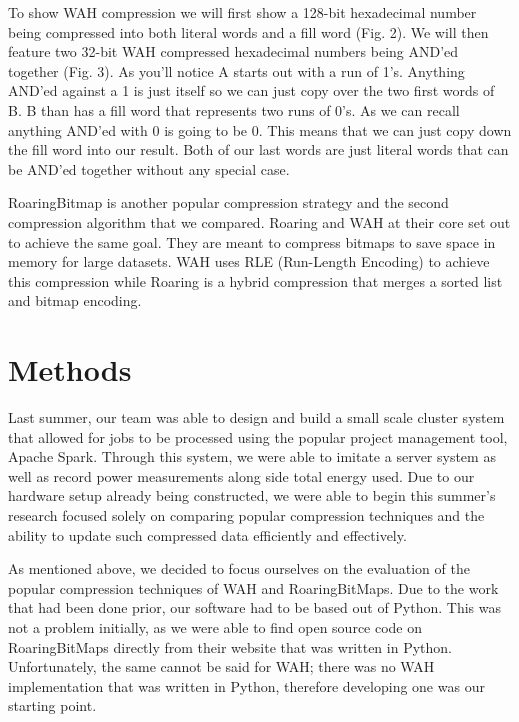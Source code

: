 \documentclass{article}
\begin{document}
To show WAH compression we will first show a 128-bit hexadecimal number being compressed into both literal words and a fill word (Fig. 2). We will then feature two 32-bit WAH compressed hexadecimal numbers being AND’ed together (Fig. 3). As you’ll notice A starts out with a run of 1’s. Anything AND’ed against a 1 is just itself so we can just copy over the two first words of B. B than has a fill word that represents two runs of 0’s. As we can recall anything AND’ed with 0 is going to be 0. This means that we can just copy down the fill word into our result. Both of our last words are just literal words that can be AND’ed together without any special case. \par



RoaringBitmap is another popular compression strategy and the second compression algorithm that we compared. Roaring and WAH at their core set out to achieve the same goal. They are meant to compress bitmaps to save space in memory for large datasets. WAH uses RLE (Run-Length Encoding) to achieve this compression while Roaring is a hybrid compression that merges a sorted list and bitmap encoding. \par


%
%
\section{Methods}
%
%

Last summer, our team was able to design and build a small scale cluster system that allowed for jobs to be processed using the popular project management tool, Apache Spark. Through this system, we were able to imitate a server system as well as record power measurements along side total energy used. Due to our hardware setup already being constructed, we were able to begin this summer's research focused solely on comparing popular compression techniques and the ability to update such compressed data efficiently and effectively. \par 
As mentioned above, we decided to focus ourselves on the evaluation of the popular compression techniques of WAH and RoaringBitMaps. Due to the work that had been done prior, our software had to be based out of Python. This was not a problem initially, as we were able to find open source code on RoaringBitMaps directly from their website that was written in Python. Unfortunately, the same cannot be said for WAH; there was no WAH implementation that was written in Python, therefore developing one was our starting point. \par
\end{document}
